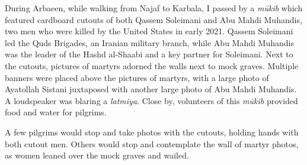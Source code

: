 



During Arbaeen, while walking from Najaf to Karbala, I passed by a \emph{mūkib} which featured cardboard cutouts of both Qassem Soleimani and Abu Mahdi Muhandis, two men who were killed by the United States in early 2021. Qassem Soleimani led the Quds Brigades, an Iranian military branch, while Abu Mahdi Muhandis was the leader of the Hashd al-Shaabi and a key partner for Soleimani. Next to the cutouts, pictures of martyrs adorned the walls next to mock graves. Multiple banners were placed above the pictures of martyrs, with a large photo of Ayatollah Sistani juxtaposed with another large photo of Abu Mahdi Muhandis. A loudspeaker was blaring a \emph{latmiya}. Close by, volunteers of this \emph{mūkib} provided food and water for pilgrims.

A few pilgrims would stop and take photos with the cutouts, holding hands with both cutout men. Others would stop and contemplate the wall of martyr photos, as women leaned over the mock graves and wailed.

